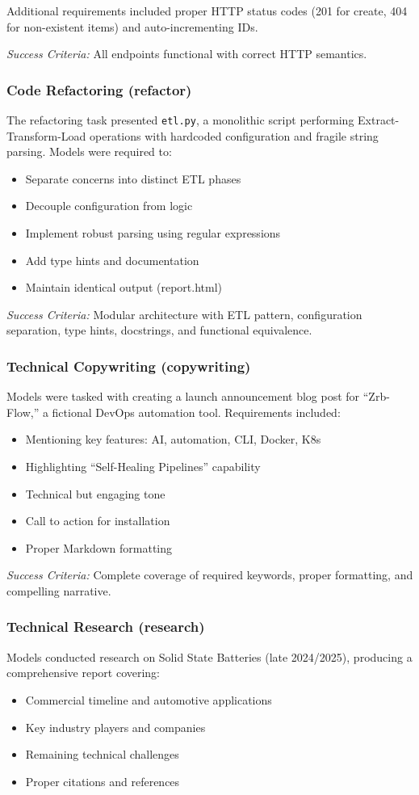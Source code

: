 Additional requirements included proper HTTP status codes (201 for create, 404 for non-existent items) and auto-incrementing IDs.

\textit{Success Criteria:} All endpoints functional with correct HTTP semantics.

\subsubsection{Code Refactoring (refactor)}
The refactoring task presented \texttt{etl.py}, a monolithic script performing Extract-Transform-Load operations with hardcoded configuration and fragile string parsing. Models were required to:
\begin{itemize}
    \item Separate concerns into distinct ETL phases
    \item Decouple configuration from logic
    \item Implement robust parsing using regular expressions
    \item Add type hints and documentation
    \item Maintain identical output (report.html)
\end{itemize}

\textit{Success Criteria:} Modular architecture with ETL pattern, configuration separation, type hints, docstrings, and functional equivalence.

\subsubsection{Technical Copywriting (copywriting)}
Models were tasked with creating a launch announcement blog post for ``Zrb-Flow,'' a fictional DevOps automation tool. Requirements included:
\begin{itemize}
    \item Mentioning key features: AI, automation, CLI, Docker, K8s
    \item Highlighting ``Self-Healing Pipelines'' capability
    \item Technical but engaging tone
    \item Call to action for installation
    \item Proper Markdown formatting
\end{itemize}

\textit{Success Criteria:} Complete coverage of required keywords, proper formatting, and compelling narrative.

\subsubsection{Technical Research (research)}
Models conducted research on Solid State Batteries (late 2024/2025), producing a comprehensive report covering:
\begin{itemize}
    \item Commercial timeline and automotive applications
    \item Key industry players and companies
    \item Remaining technical challenges
    \item Proper citations and references
\end{itemize}

